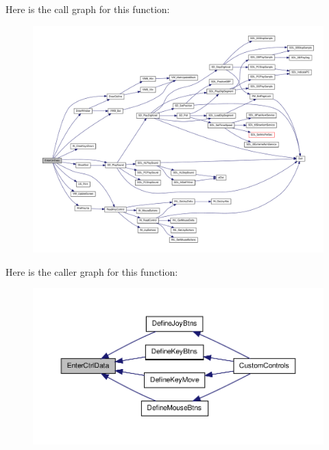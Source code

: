 Here is the call graph for this function:
\nopagebreak
\begin{figure}[H]
\begin{center}
\leavevmode
\includegraphics[width=400pt]{WL__MENU_8C_a94d0412c951284a8ea98378116c23566_cgraph}
\end{center}
\end{figure}




Here is the caller graph for this function:
\nopagebreak
\begin{figure}[H]
\begin{center}
\leavevmode
\includegraphics[width=400pt]{WL__MENU_8C_a94d0412c951284a8ea98378116c23566_icgraph}
\end{center}
\end{figure}



